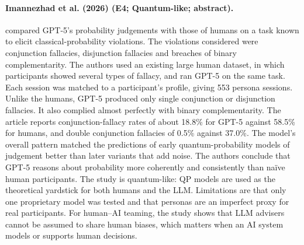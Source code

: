 \documentclass[10pt,a4paper]{article}
\begin{document}
\paragraph{Imannezhad et al. (2026) (E4; Quantum-like; abstract).} \citet{Imannezhad2026} compared GPT-5's probability judgements with those of humans on a task known to elicit classical-probability violations. The violations considered were conjunction fallacies, disjunction fallacies and breaches of binary complementarity. The authors used an existing large human dataset, in which participants showed several types of fallacy, and ran GPT-5 on the same task. Each session was matched to a participant's profile, giving 553 persona sessions. Unlike the humans, GPT-5 produced only single conjunction or disjunction fallacies. It also complied almost perfectly with binary complementarity. The article reports conjunction-fallacy rates of about 18.8\% for GPT-5 against 58.5\% for humans, and double conjunction fallacies of 0.5\% against 37.0\%. The model's overall pattern matched the predictions of early quantum-probability models of judgement better than later variants that add noise. The authors conclude that GPT-5 reasons about probability more coherently and consistently than naïve human participants. The study is quantum-like: QP models are used as the theoretical yardstick for both humans and the LLM. Limitations are that only one proprietary model was tested and that personas are an imperfect proxy for real participants. For human--AI teaming, the study shows that LLM advisers cannot be assumed to share human biases, which matters when an AI system models or supports human decisions.
\end{document}
